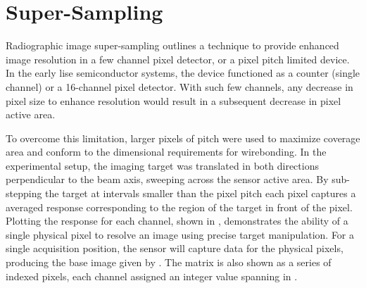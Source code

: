 \documentclass[../../main.tex]{subfiles}
\begin{document}
%
    \section{Super-Sampling}%
    \label{app:image-processing:super-sampling}%
    Radiographic image \gls{super-sampling} outlines a technique to provide enhanced image resolution in a few channel pixel detector, or a pixel pitch limited device.
    In the early \gls{lise} semiconductor systems, the device functioned as a counter (single channel) or a 16-channel pixel detector.
    With such few channels, any decrease in pixel size to enhance resolution would result in a subsequent decrease in pixel active area.
    \par%
    To overcome this limitation, larger pixels of pitch  were used to maximize coverage area and conform to the dimensional requirements for wirebonding.
    In the experimental setup, the imaging target was translated in both directions perpendicular to the beam axis, sweeping across the sensor active area.
    By sub-stepping the target at intervals smaller than the pixel pitch  each pixel captures a averaged response corresponding to the region of the target in front of the pixel.
    Plotting the response for each channel, shown in , demonstrates the ability of a single physical pixel to resolve an image using precise target manipulation.
    For a single acquisition position, the sensor will capture data for the physical  pixels, producing the base image  given by .
    The matrix is also shown as a series of indexed pixels, each channel  assigned an integer value spanning \Xmath{[1,M_{0}N_{0}]} in .
\end{document}
